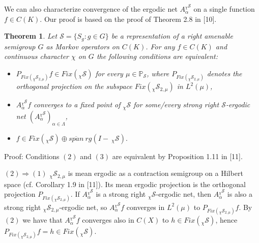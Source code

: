 \documentclass{amsart}
\newtheorem{thm}{Theorem}[section]
\theoremstyle{definition}
\theoremstyle{remark}
\numberwithin{equation}{section}
\newcommand{\bs}{\rightline{$\blacksquare$}}
\begin{document}
\bs

We can also characterize convergence of the ergodic net $A_{\alpha}^{_{\chi}\mathcal{S}}$ on a single function $f \in C(K)$. Our proof is based on the proof of Theorem 2.8 in [10].

\begin{thm}\label{t:single_markov_ww}
Let $\mathcal{S} = \{ S_g : g\in G \}$ be a representation of a right amenable semigroup $G$ as Markov operators on $C(K)$. For any $f \in C(K)$ and continuous character $\chi$ on $G$ the following conditions are equivalent:
\begin{itemize}
\item[(1)] $P_{Fix(_{\chi}\mathcal{S}_{2,\mu})}f \in Fix(_{\chi}\mathcal{S})$ for every $\mu \in \mathbb{P}_{\mathcal{S}}$, where $P_{Fix(_{\chi}\mathcal{S}_{2,\mu})}$ denotes the orthogonal projection on the subspace $Fix(_{\chi}\mathcal{S}_{2,\mu})$ in $L^2(\mu)$,
\item[(2)] $A_{\alpha}^{_{\chi}\mathcal{S}} f$ converges to a fixed point of $_{\chi}\mathcal{S}$ for some/every strong right $\mathcal{S}$-ergodic net $(A_{\alpha}^{_{\chi}\mathcal{S}})_{\alpha \in \Lambda}$,
\item[(3)] $f \in Fix(_{\chi}\mathcal{S}) \oplus \overline{span}\ rg (I -\ _{\chi}\mathcal{S}).$
\end{itemize}
\end{thm}

Proof: Conditions $(2)$ and $(3)$ are equivalent by Proposition 1.11 in [11].

$(2) \Rightarrow (1)$  $_{\chi}\mathcal{S}_{2,\mu}$ is mean ergodic as a contraction semigroup on a Hilbert space (cf. Corollary 1.9 in [11]). Its mean ergodic projection is the orthogonal projection $P_{Fix(_{\chi}\mathcal{S}_{2,\mu})}$. If $A_{\alpha}^{_{\chi}\mathcal{S}}$ is a strong right $_{\chi}\mathcal{S}$-ergodic net, then $A_{\alpha}^{_{\chi}\mathcal{S}}$ is also a strong right $_{\chi}\mathcal{S}_{2,\mu}$-ergodic net, so $A_{\alpha}^{_{\chi}\mathcal{S}} f$ converges in $L^2(\mu)$ to $P_{Fix(_{\chi}\mathcal{S}_{2,\mu})}f$. By $(2)$ we have that $A_{\alpha}^{_{\chi}\mathcal{S}} f$ converges also in $C(X)$ to $h \in Fix(_{\chi}\mathcal{S})$, hence $P_{Fix(_{\chi}\mathcal{S}_{2,\mu})}f = h \in Fix(_{\chi}\mathcal{S})$.
\end{document}
